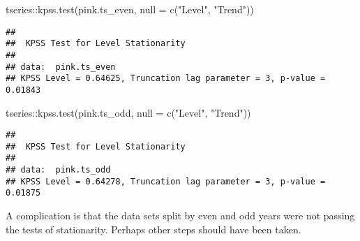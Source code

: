 \documentclass[
]{article}
\newenvironment{Shaded}{\begin{snugshade}}{\end{snugshade}}
\newcommand{\AttributeTok}[1]{\textcolor[rgb]{0.77,0.63,0.00}{#1}}
\newcommand{\FunctionTok}[1]{\textcolor[rgb]{0.00,0.00,0.00}{#1}}
\newcommand{\NormalTok}[1]{#1}
\newcommand{\SpecialCharTok}[1]{\textcolor[rgb]{0.00,0.00,0.00}{#1}}
\newcommand{\StringTok}[1]{\textcolor[rgb]{0.31,0.60,0.02}{#1}}
\begin{document}
\begin{Shaded}
\begin{Highlighting}[]
\NormalTok{tseries}\SpecialCharTok{::}\FunctionTok{kpss.test}\NormalTok{(pink.ts\_even, }\AttributeTok{null =} \FunctionTok{c}\NormalTok{(}\StringTok{"Level"}\NormalTok{, }\StringTok{"Trend"}\NormalTok{))}
\end{Highlighting}
\end{Shaded}

\begin{verbatim}
## 
##  KPSS Test for Level Stationarity
## 
## data:  pink.ts_even
## KPSS Level = 0.64625, Truncation lag parameter = 3, p-value = 0.01843
\end{verbatim}

\begin{Shaded}
\begin{Highlighting}[]
\NormalTok{tseries}\SpecialCharTok{::}\FunctionTok{kpss.test}\NormalTok{(pink.ts\_odd, }\AttributeTok{null =} \FunctionTok{c}\NormalTok{(}\StringTok{"Level"}\NormalTok{, }\StringTok{"Trend"}\NormalTok{))}
\end{Highlighting}
\end{Shaded}

\begin{verbatim}
## 
##  KPSS Test for Level Stationarity
## 
## data:  pink.ts_odd
## KPSS Level = 0.64278, Truncation lag parameter = 3, p-value = 0.01875
\end{verbatim}

A complication is that the data sets split by even and odd years were
not passing the tests of stationarity. Perhaps other steps should have
been taken.
\end{document}
